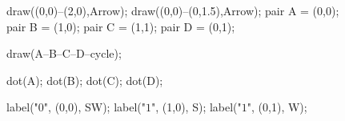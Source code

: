 \documentclass[../textbook.tex]{subfiles}
\begin{document}

\begin{figure}[h]
	\begin{center}
		\begin{minipage}[b]{\textwidth}
			\centering
			\begin{asy}[width=0.3\textwidth]
			draw((0,0)--(2,0),Arrow);
			draw((0,0)--(0,1.5),Arrow);
			pair A = (0,0);
			pair B = (1,0);
			pair C = (1,1);
			pair D = (0,1);

			draw(A--B--C--D--cycle);

			dot(A);
			dot(B);
			dot(C);
			dot(D);

			label("$0$", (0,0), SW);
			label("$1$", (1,0), S);
			label("$1$", (0,1), W);
			\end{asy}
		\end{minipage}
	\end{center}
	\vspace*{-2\baselineskip}
	\begin{center}
		\begin{minipage}[t]{\textwidth}
			\label{fig:unit_square}
		\end{minipage}
	\end{center}
	\vspace*{-2\baselineskip}
\end{figure}
\end{document}
